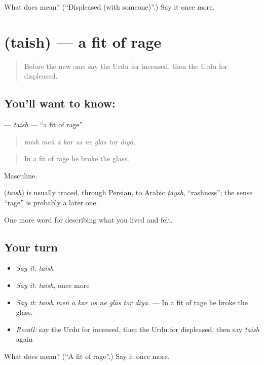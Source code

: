 \begin{tcolorbox}[breakable,colback=teal!4,colframe=teal!35!black,title={Before you move on}]
What does  mean? (\textquotedblleft{}Displeased (with someone)\textquotedblright{}.) Say it once more.
\end{tcolorbox}
\section[\texorpdfstring{\ur{طیش} (taish)}{طیش (taish)}]{ (taish) — a fit of rage}

\label{lesson:UR-C444-taish}



\begin{quote}
Before the new one: say the Urdu for incensed, then the Urdu for displeased.
\end{quote}

\subsection*{You'll want to know: }
\textbf{} — \emph{taish} — \textquotedblleft{}a fit of rage\textquotedblright{}.

\begin{quote}
        
\end{quote}

\begin{quote}
\emph{taish meṅ ā kar us ne glās toṛ diyā.}
\end{quote}

\begin{quote}
In a fit of rage he broke the glass.
\end{quote}

Masculine.

\begin{cousinweb}
\textbf{} (\emph{taish}) is usually traced, through Persian, to Arabic \emph{ṭaysh}, \textquotedblleft{}rashness\textquotedblright{}; the sense \textquotedblleft{}rage\textquotedblright{} is probably a later one.
\end{cousinweb}

\begin{grammarlens}[title={What you've built}]
One more word for describing what you lived and felt.
\end{grammarlens}

\subsection*{Your turn}
\begin{itemize}
\raggedright
  \item \emph{Say it:} \emph{taish}
  \item \emph{Say it:} \emph{taish}, once more
  \item \emph{Say it:} \emph{taish meṅ ā kar us ne glās toṛ diyā.} — In a fit of rage he broke the glass.
  \item \emph{Recall:} say the Urdu for incensed, then the Urdu for displeased, then say \emph{taish} again
\end{itemize}

\begin{tcolorbox}[breakable,colback=teal!4,colframe=teal!35!black,title={Before you move on}]
What does  mean? (\textquotedblleft{}A fit of rage\textquotedblright{}.) Say it once more.
\end{tcolorbox}
